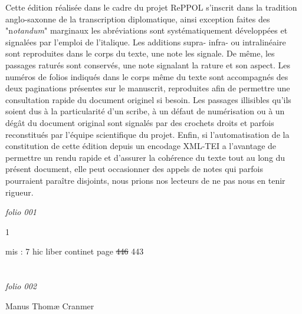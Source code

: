 \documentclass[12pt, a4paper]{book}
\begin{document}
Cette édition réalisée dans le cadre du projet RePPOL s'inscrit dans la tradition anglo-saxonne de la transcription diplomatique, ainsi exception faites des "n\textit{otandum}" marginaux les abréviations sont systématiquement développées et signalées par l'emploi de l'italique. Les additions supra- infra- ou intralinéaire sont reproduites dans le corps du texte, une note les signale. De même, les passages raturés sont conservés, une note signalant la rature et son aspect. Les numéros de folios indiqués dans le corps même du texte sont accompagnés des deux paginations présentes sur le manuscrit, reproduites afin de permettre une consultation rapide du document originel si besoin. Les passages illisibles qu'ils soient dus à la particularité d'un scribe, à un défaut de numérisation ou à un dégât du document original sont signalés par des crochets droits et parfois reconstitués par l'équipe scientifique du projet.
Enfin, si l'automatisation de la constitution de cette édition depuis un encodage XML-TEI a l'avantage de permettre un rendu rapide et d'assurer la cohérence du texte tout au long du présent document, elle peut occasionner des appels de notes qui parfois pourraient paraître disjoints, nous prions nos lecteurs de ne pas nous en tenir rigueur.
\tableofcontents
\newpage
{}

\textit{folio 001}
		
		 \begin{flushright}{\color{Mahogany}1}\end{flushright}
		
		\ifthenelse{\isodd{\thepage}}
		{\reversemarginpar}
		{\normalmarginpar}
		mis : 7 hic liber continet page \sout{446} 443

      	
\dotfill
						\newpage {} \section*{}  \subsection*{}

\textit{folio 002}
			
            		
            			Manus Thomæ Cranmer
            		
\end{document}
